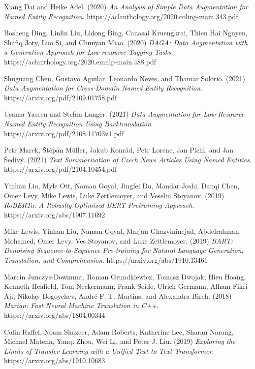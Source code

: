 \documentclass[12pt]{report}
\begin{document}
\begin{thebibliography}{9}

        Xiang Dai and Heike Adel. (2020) \emph{An Analysis of Simple Data Augmentation for Named Entity Recognition}.
        https://aclanthology.org/2020.coling-main.343.pdf
    
        Bosheng Ding, Linlin Liu, Lidong Bing, Canasai Kruengkrai, Thien Hai Nguyen, Shafiq Joty, Luo Si, and Chunyan Miao. (2020) \emph{DAGA: Data Augmentation with a Generation Approach for Low-resource Tagging Tasks}.
        https://aclanthology.org/2020.emnlp-main.488.pdf
    
        Shuguang Chen, Gustavo Aguilar, Leonardo Neves, and Thamar Solorio. (2021) \emph{Data Augmentation for Cross-Domain Named Entity Recognition}.
        https://arxiv.org/pdf/2109.01758.pdf
    
        Usama Yaseen and Stefan Langer. (2021) \emph{Data Augmentation for Low-Resource Named Entity Recognition Using Backtranslation}.
        https://arxiv.org/pdf/2108.11703v1.pdf
    
        Petr Marek, Štěpán Müller, Jakub Konrád, Petr Lorenc, Jan Pichl, and Jan Šedivý. (2021) \emph{Text Summarization of Czech News Articles Using Named Entities}.
        https://arxiv.org/pdf/2104.10454.pdf
    
        Yinhan Liu, Myle Ott, Naman Goyal, Jingfei Du, Mandar Joshi, Danqi Chen, Omer Levy, Mike Lewis, Luke Zettlemoyer, and Veselin Stoyanov. (2019) \emph{RoBERTa: A Robustly Optimized BERT Pretraining Approach}.
        https://arxiv.org/abs/1907.11692
    
        Mike Lewis, Yinhan Liu, Naman Goyal, Marjan Ghazvininejad, Abdelrahman Mohamed, Omer Levy, Ves Stoyanov, and Luke Zettlemoyer. (2019) \emph{BART: Denoising Sequence-to-Sequence Pre-training for Natural Language Generation, Translation, and Comprehension}.
        https://arxiv.org/abs/1910.13461

        Marcin Junczys-Dowmunt, Roman Grundkiewicz, Tomasz Dwojak, Hieu Hoang, Kenneth Heafield, Tom Neckermann, Frank Seide, Ulrich Germann, Alham Fikri Aji, Nikolay Bogoychev, André F. T. Martins, and Alexandra Birch. (2018) \emph{Marian: Fast Neural Machine Translation in C++}.
        https://arxiv.org/abs/1804.00344 

        Colin Raffel, Noam Shazeer, Adam Roberts, Katherine Lee, Sharan Narang, Michael Matena, Yanqi Zhou, Wei Li, and Peter J. Liu. (2019) \emph{Exploring the Limits of Transfer Learning with a Unified Text-to-Text Transformer}.
        https://arxiv.org/abs/1910.10683
        

\end{thebibliography}
\end{document}
